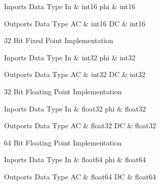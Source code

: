\begin{XtoCtabular}{Inports Data Type}
In & int16\tabularnewline
\hline
phi & int16\tabularnewline
\hline
\end{XtoCtabular}

\begin{XtoCtabular}{Outports Data Type}
AC & int16\tabularnewline
\hline
DC & int16\tabularnewline
\hline
\end{XtoCtabular}

\ifdefined \AddTestReports
{}
\fi
{}
\nopagebreak[0]

32 Bit Fixed Point Implementation

\begin{XtoCtabular}{Inports Data Type}
In & int32\tabularnewline
\hline
phi & int32\tabularnewline
\hline
\end{XtoCtabular}

\begin{XtoCtabular}{Outports Data Type}
AC & int32\tabularnewline
\hline
DC & int32\tabularnewline
\hline
\end{XtoCtabular}

\ifdefined \AddTestReports
{}
\fi
{}
\nopagebreak[0]

32 Bit Floating Point Implementation

\begin{XtoCtabular}{Inports Data Type}
In & float32\tabularnewline
\hline
phi & float32\tabularnewline
\hline
\end{XtoCtabular}

\begin{XtoCtabular}{Outports Data Type}
AC & float32\tabularnewline
\hline
DC & float32\tabularnewline
\hline
\end{XtoCtabular}

\ifdefined \AddTestReports
{}
\fi
{}
\nopagebreak[0]

64 Bit Floating Point Implementation

\begin{XtoCtabular}{Inports Data Type}
In & float64\tabularnewline
\hline
phi & float64\tabularnewline
\hline
\end{XtoCtabular}

\begin{XtoCtabular}{Outports Data Type}
AC & float64\tabularnewline
\hline
DC & float64\tabularnewline
\hline
\end{XtoCtabular}

\ifdefined \AddTestReports
{}
\fi
